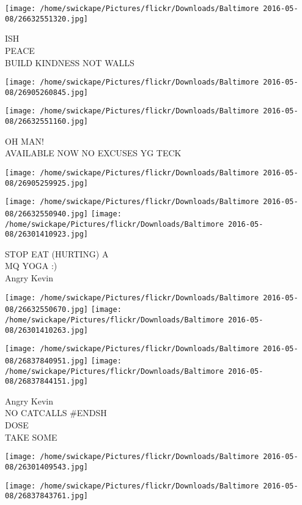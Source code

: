 \documentclass[10pt,letterpaper]{article}
\begin{document}
\texttt{[image: /home/swickape/Pictures/flickr/Downloads/Baltimore 2016-05-08/26632551320.jpg]}

ISH\\
PEACE\\
BUILD KINDNESS NOT WALLS
\pagebreak

\texttt{[image: /home/swickape/Pictures/flickr/Downloads/Baltimore 2016-05-08/26905260845.jpg]}

\vspace{0.25in}
\texttt{[image: /home/swickape/Pictures/flickr/Downloads/Baltimore 2016-05-08/26632551160.jpg]}

OH MAN!\\
AVAILABLE NOW NO EXCUSES YG TECK
\pagebreak

\texttt{[image: /home/swickape/Pictures/flickr/Downloads/Baltimore 2016-05-08/26905259925.jpg]}

\vspace{0.25in}
\texttt{[image: /home/swickape/Pictures/flickr/Downloads/Baltimore 2016-05-08/26632550940.jpg]}
\texttt{[image: /home/swickape/Pictures/flickr/Downloads/Baltimore 2016-05-08/26301410923.jpg]}

STOP EAT (HURTING) A\\
MQ YOGA :)\\
Angry Kevin
\pagebreak

\texttt{[image: /home/swickape/Pictures/flickr/Downloads/Baltimore 2016-05-08/26632550670.jpg]}
\texttt{[image: /home/swickape/Pictures/flickr/Downloads/Baltimore 2016-05-08/26301410263.jpg]}

\texttt{[image: /home/swickape/Pictures/flickr/Downloads/Baltimore 2016-05-08/26837840951.jpg]}
\texttt{[image: /home/swickape/Pictures/flickr/Downloads/Baltimore 2016-05-08/26837844151.jpg]}

Angry Kevin\\
NO CATCALLS \#ENDSH\\
DOSE\\
TAKE SOME
\pagebreak

\texttt{[image: /home/swickape/Pictures/flickr/Downloads/Baltimore 2016-05-08/26301409543.jpg]}

\vspace{0.25in}
\texttt{[image: /home/swickape/Pictures/flickr/Downloads/Baltimore 2016-05-08/26837843761.jpg]}
\end{document}
